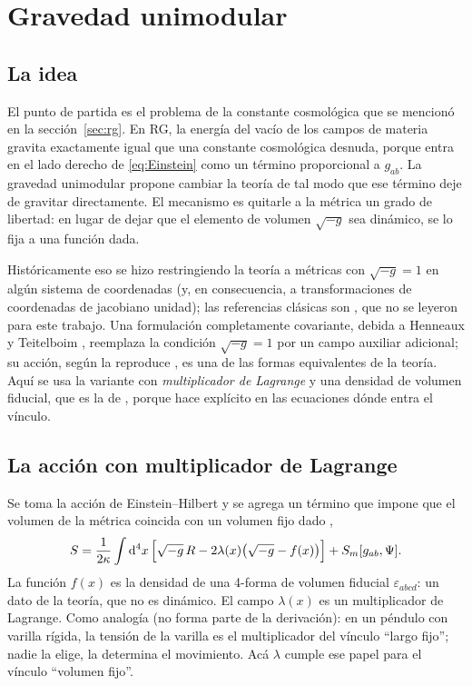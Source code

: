 \section{Gravedad unimodular}
\label{sec:ug}

\subsection{La idea}

El punto de partida es el problema de la constante cosmológica que se mencionó en la sección~\ref{sec:rg}. En RG, la energía del vacío de los campos de materia gravita exactamente igual que una constante cosmológica desnuda, porque entra en el lado derecho de \eqref{eq:Einstein} como un término proporcional a $g_{ab}$. La gravedad unimodular propone cambiar la teoría de tal modo que ese término deje de gravitar directamente. El mecanismo es quitarle a la métrica un grado de libertad: en lugar de dejar que el elemento de volumen $\sqrt{-g}$ sea dinámico, se lo fija a una función dada.

Históricamente eso se hizo restringiendo la teoría a métricas con $\sqrt{-g}=1$ en algún sistema de coordenadas (y, en consecuencia, a transformaciones de coordenadas de jacobiano unidad); las referencias clásicas son \cite{anderson71,ng91}, que no se leyeron para este trabajo. Una formulación completamente covariante, debida a Henneaux y Teitelboim \cite{henneaux89}, reemplaza la condición $\sqrt{-g}=1$ por un campo auxiliar adicional; su acción, según la reproduce \cite{padilla15}, es una de las formas equivalentes de la teoría. Aquí se usa la variante con \emph{multiplicador de Lagrange} y una densidad de volumen fiducial, que es la de \cite{bengochea23}, porque hace explícito en las ecuaciones dónde entra el vínculo.

\subsection{La acción con multiplicador de Lagrange}

Se toma la acción de Einstein--Hilbert y se agrega un término que impone que el volumen de la métrica coincida con un volumen fijo dado ,
\begin{equation}
S=\frac{1}{2\kappa}\int\mathrm d^4x\,\Big[\sqrt{-g}\,R-2\lambda(x)\big(\sqrt{-g}-f(x)\big)\Big]+S_m[g_{ab},\Psi].
\label{eq:SUG}
\end{equation}
La función $f(x)$ es la densidad de una 4-forma de volumen fiducial $\varepsilon_{abcd}$: un dato de la teoría, que no es dinámico. El campo $\lambda(x)$ es un multiplicador de Lagrange. Como analogía (no forma parte de la derivación): en un péndulo con varilla rígida, la tensión de la varilla es el multiplicador del vínculo ``largo fijo''; nadie la elige, la determina el movimiento. Acá $\lambda$ cumple ese papel para el vínculo ``volumen fijo''.


